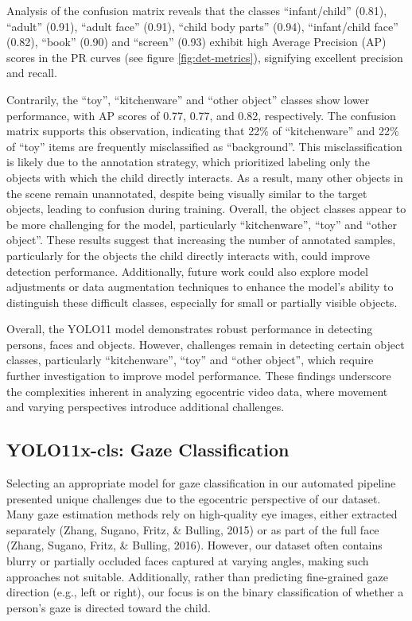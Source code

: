 \documentclass[
  man,floatsintext]{apa6}
\begin{document}
Analysis of the confusion matrix reveals that the classes ``infant/child'' (0.81), ``adult'' (0.91), ``adult face'' (0.91), ``child body parts'' (0.94), ``infant/child face'' (0.82), ``book'' (0.90) and ``screen'' (0.93) exhibit high Average Precision (AP) scores in the PR curves (see figure \ref{fig:det-metrics}), signifying excellent precision and recall.

Contrarily, the ``toy'', ``kitchenware'' and ``other object'' classes show lower performance, with AP scores of 0.77, 0.77, and 0.82, respectively. The confusion matrix supports this observation, indicating that 22\% of ``kitchenware'' and 22\% of ``toy'' items are frequently misclassified as ``background''. This misclassification is likely due to the annotation strategy, which prioritized labeling only the objects with which the child directly interacts. As a result, many other objects in the scene remain unannotated, despite being visually similar to the target objects, leading to confusion during training. Overall, the object classes appear to be more challenging for the model, particularly ``kitchenware'', ``toy'' and ``other object''. These results suggest that increasing the number of annotated samples, particularly for the objects the child directly interacts with, could improve detection performance. Additionally, future work could also explore model adjustments or data augmentation techniques to enhance the model's ability to distinguish these difficult classes, especially for small or partially visible objects.

Overall, the YOLO11 model demonstrates robust performance in detecting persons, faces and objects. However, challenges remain in detecting certain object classes, particularly ``kitchenware'', ``toy'' and ``other object'', which require further investigation to improve model performance. These findings underscore the complexities inherent in analyzing egocentric video data, where movement and varying perspectives introduce additional challenges.

\subsection{YOLO11x-cls: Gaze Classification}\label{yolo11x-cls-gaze-classification}

Selecting an appropriate model for gaze classification in our automated pipeline presented unique challenges due to the egocentric perspective of our dataset. Many gaze estimation methods rely on high-quality eye images, either extracted separately (Zhang, Sugano, Fritz, \& Bulling, 2015) or as part of the full face (Zhang, Sugano, Fritz, \& Bulling, 2016). However, our dataset often contains blurry or partially occluded faces captured at varying angles, making such approaches not suitable. Additionally, rather than predicting fine-grained gaze direction (e.g., left or right), our focus is on the binary classification of whether a person's gaze is directed toward the child.
\end{document}
